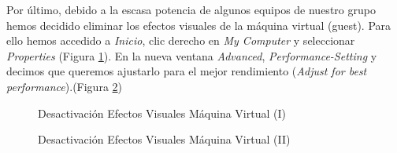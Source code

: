 \documentclass{scrartcl}
\begin{document}
Por último, debido a la escasa potencia de algunos equipos de nuestro grupo hemos decidido eliminar los efectos visuales de la máquina virtual (guest). Para ello hemos accedido a \textit{Inicio}, clic derecho en \textit{My Computer} y seleccionar \textit{Properties} (Figura \ref{fig:ConfVM04}). En la nueva ventana \textit{Advanced}, \textit{Performance-Setting} y decimos que queremos ajustarlo para el mejor rendimiento (\textit{Adjust for best performance}).(Figura \ref{fig:ConfVM05})

\begin{figure}[H]
	
	\centering
	\caption{Desactivación Efectos Visuales Máquina Virtual (I)}
	\label{fig:ConfVM04}
	
\end{figure}

\begin{figure}[H]
	
	\centering
	\caption{Desactivación Efectos Visuales Máquina Virtual (II)}
	\label{fig:ConfVM05}
	
\end{figure}
\end{document}
